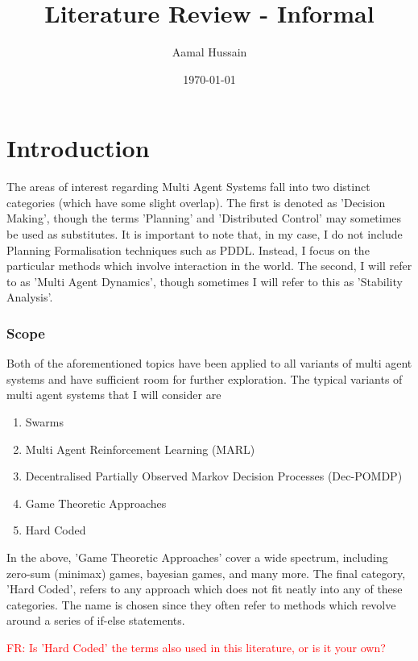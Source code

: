 \documentclass[preprint,11pt]{report}
\title{Literature Review - Informal}
\author{Aamal Hussain}
\date{\today}
\newcommand\fr[1]{\textcolor{red}{FR: #1}}
\begin{document}
\maketitle 

\tableofcontents

\chapter*{Introduction}



The areas of interest regarding Multi Agent Systems fall into two
distinct categories (which have some slight overlap). The first is
denoted as 'Decision Making', though the terms 'Planning' and
'Distributed Control' may sometimes be used as substitutes. It is
important to note that, in my case, I do not include Planning
Formalisation techniques such as PDDL. Instead, I focus on the
particular methods which involve interaction in the world. The second,
I will refer to as 'Multi Agent Dynamics', though sometimes I will
refer to this as 'Stability Analysis'.

\subsection*{Scope}

Both of the aforementioned topics have been applied to all variants of
multi agent systems and have sufficient room for further
exploration. The typical variants of multi agent systems that I will
consider are

\begin{enumerate} \item Swarms \item Multi Agent Reinforcement Learning (MARL) \item Decentralised
Partially Observed Markov Decision Processes (Dec-POMDP) \item Game Theoretic Approaches \item Hard
Coded \end{enumerate}

In the above, 'Game Theoretic Approaches' cover a wide spectrum,
including zero-sum (minimax) games, bayesian games, and many more. The
final category, 'Hard Coded', refers to any approach which does not
fit neatly into any of these categories. The name is chosen since they
often refer to methods which revolve around a series of if-else
statements.

\fr{Is 'Hard Coded' the terms also used in this literature, or is it your own?}
\end{document}
